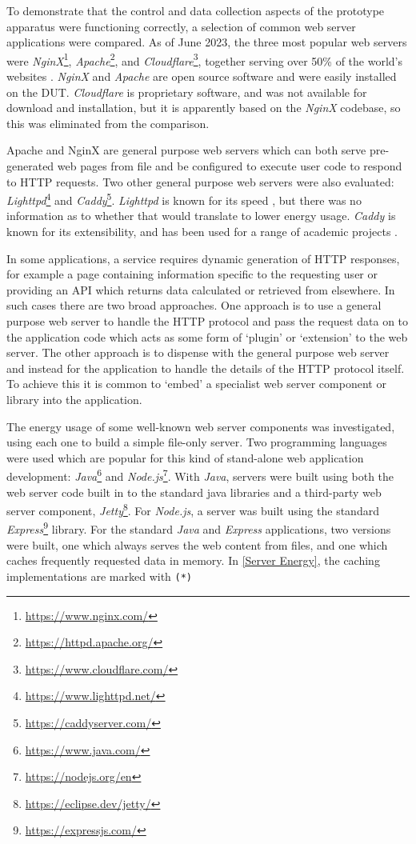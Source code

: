 To demonstrate that the control and data collection aspects of the prototype apparatus were functioning correctly, a selection of common web server applications were compared. As of June 2023, the three most popular web servers were \emph{NginX}\footnote{\url{https://www.nginx.com/}}, \emph{Apache}\footnote{\url{https://httpd.apache.org/}}, and \emph{Cloudflare}\footnote{\url{https://www.cloudflare.com/}}, together serving over 50\% of the world's websites \citep{Netcraft2023}. \emph{NginX} and \emph{Apache} are open source software and were easily installed on the DUT. \emph{Cloudflare} is proprietary software, and was not available for download and installation, but it is apparently based on the \emph{NginX} codebase, so this was eliminated from the comparison.

Apache and NginX are general purpose web servers which can both serve pre-generated web pages from file and be configured to execute user code to respond to HTTP requests. Two other general purpose web servers were also evaluated: \emph{Lighttpd}\footnote{\url{https://www.lighttpd.net/}} and \emph{Caddy}\footnote{\url{https://caddyserver.com/}}. \emph{Lighttpd} is known for its speed \citep{Bogus2008}, but there was no information as to whether that would translate to lower energy usage. \emph{Caddy} is known for its extensibility, and has been used for a range of academic projects \citep{OCallaghan2017} \citep{Ardi2021}.

In some applications, a service requires dynamic generation of HTTP responses, for example a page containing information specific to the requesting user or providing an API which returns data calculated or retrieved from elsewhere. In such cases there are two broad approaches. One approach is to use a general purpose web server to handle the HTTP protocol and pass the request data on to the application code which acts as some form of `plugin' or `extension' to the web server. The other approach is to dispense with the general purpose web server and instead  for the application to handle the details of the HTTP protocol itself. To achieve this it is common to `embed' a specialist web server component or library into the application.

The energy usage of some well-known web server components was investigated, using each one to build a simple file-only server. Two programming languages were used which are popular for this kind of stand-alone web application development: \emph{Java}\footnote{\url{https://www.java.com/}} and \emph{Node.js}\footnote{\url{https://nodejs.org/en}}. With \emph{Java}, servers were built using both the web server code built in to the standard java libraries and a third-party web server component, \emph{Jetty}\footnote{\url{https://eclipse.dev/jetty/}}. For \emph{Node.js}, a server was built using the standard \emph{Express}\footnote{\url{https://expressjs.com/}} library. For the standard \emph{Java} and \emph{Express} applications, two versions were built, one which always serves the web content from files, and one which caches frequently requested data in memory. In \autoref{Server Energy}, the caching implementations are marked with \verb!(*)!

